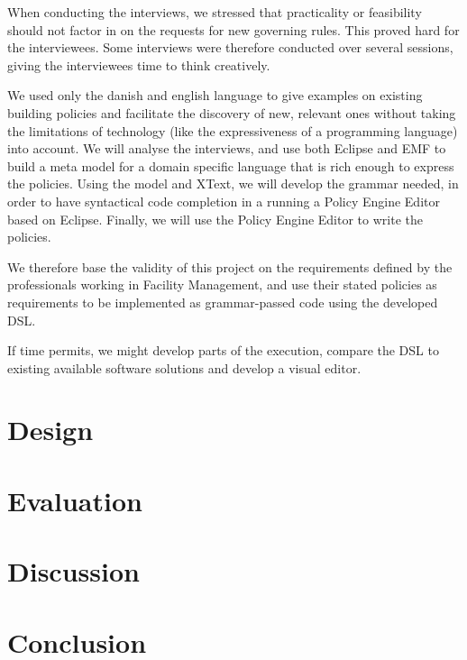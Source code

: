 \documentclass{llncs}
\begin{document}
When conducting the interviews, we stressed that practicality or feasibility should not factor in on the requests for new governing rules. This proved hard for the interviewees. Some interviews were therefore conducted over several sessions, giving the interviewees time to think creatively. 

We used only the danish and english language to give examples on 
 existing building policies and facilitate the discovery of new, relevant ones without taking the limitations of technology (like the expressiveness of a programming language) into account. We will analyse the interviews, and use both Eclipse and EMF to build a meta model for a domain specific language that is rich enough to express the policies. Using the model and XText, we will develop the grammar needed, in order to have syntactical code completion in a running a Policy Engine Editor based on Eclipse. Finally, we will use the Policy Engine Editor to write the policies.

We therefore base the validity of this project on the requirements defined by the professionals working in Facility Management, and use their stated policies as requirements to be implemented as grammar-passed code using the developed DSL.

If time permits, we might develop parts of the execution, compare the DSL to existing available software solutions and develop a visual editor.

\section{Design}\label{sec:design}

\section{Evaluation}\label{sec:evaluation}

\section{Discussion}\label{sec:discussion}

\section{Conclusion}\label{sec:conclusion}

{}

\end{document}
